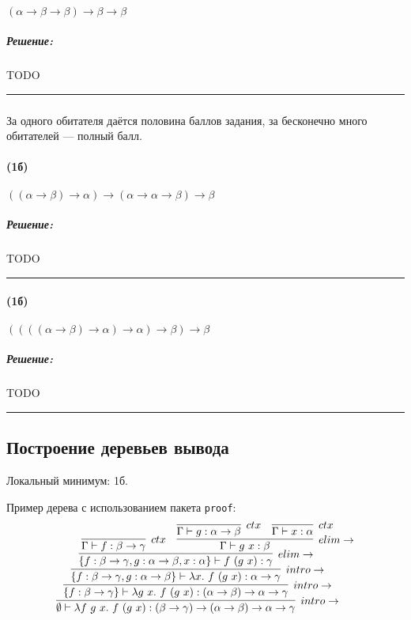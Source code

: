 \documentclass{article}
\newenvironment{proof}{\subparagraph{\hspace{-1em}Решение:\newline}}{\par\noindent\rule{\textwidth}{0.4pt}}
\begin{document}
    \paragraph{} $(\alpha \to \beta \to \beta) \to \beta \to \beta$

    \begin{proof}
        TODO %
    \end{proof}

    \subsubsection{}

    За одного обитателя даётся половина баллов задания, за бесконечно много обитателей --- полный балл.

    \paragraph{(1б)} $((\alpha \to \beta) \to \alpha) \to (\alpha \to \alpha \to \beta) \to \beta$

    \begin{proof}
        TODO %
    \end{proof}

    \paragraph{(1б)} $((((\alpha \to \beta) \to \alpha) \to \alpha) \to \beta) \to \beta$

    \begin{proof}
        TODO %
    \end{proof}

    \subsection{Построение деревьев вывода}

    Локальный минимум: 1б.

    Пример дерева с использованием пакета \texttt{proof}:
    \[\resizebox{0.8\hsize}{!}{
        \infer[intro\to]
        {\emptyset \vdash \lambda f~g~x.~f~(g~x) : (\beta \to \gamma) \to (\alpha \to \beta) \to \alpha \to \gamma}
        {
            \infer[intro\to]
            {\{f: \beta \to \gamma\} \vdash \lambda g~x.~f~(g~x) : (\alpha \to \beta) \to \alpha \to \gamma}
            {
                \infer[intro\to]
                {\{f : \beta \to \gamma, g : \alpha \to \beta\} \vdash \lambda x.~f~(g~x) : \alpha \to \gamma}
                {
                    \infer[elim\to]{\{f : \beta \to \gamma, g : \alpha \to \beta, x:  \alpha\} \vdash f~(g~x) : \gamma}
                    {
                        \infer[ctx]{\Gamma \vdash f : \beta \to \gamma}{} &
                        \infer[elim\to]{\Gamma \vdash g~x : \beta}{
                            \infer[ctx]{\Gamma \vdash g : \alpha \to \beta}{} &
                            \infer[ctx]{\Gamma \vdash x : \alpha}{}
                        }
                    }
                }
            }
        }
    }\]
\end{document}
